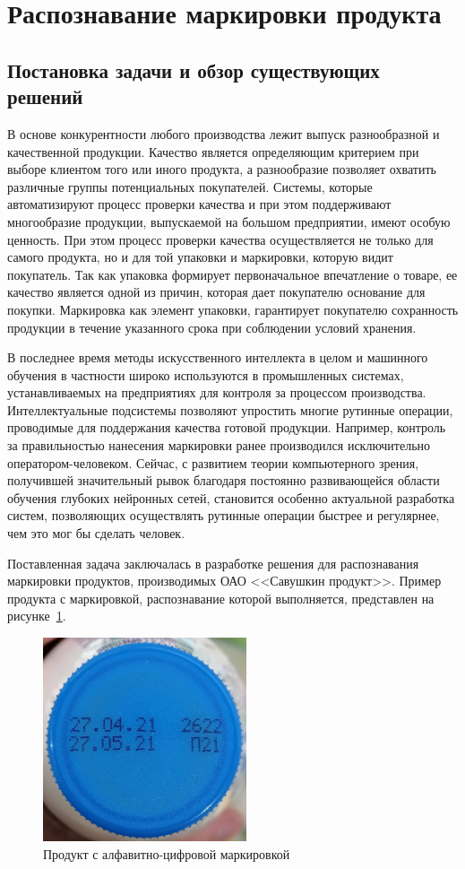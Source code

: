 \section{Распознавание маркировки продукта}

\subsection{Постановка задачи и обзор существующих решений}

В основе конкурентности любого производства лежит выпуск разнообразной и качественной продукции. Качество является определяющим критерием при выборе клиентом того или иного продукта, а разнообразие позволяет охватить различные группы потенциальных покупателей. Системы, которые автоматизируют процесс проверки качества и при этом поддерживают многообразие продукции, выпускаемой на большом предприятии, имеют особую ценность. При этом процесс проверки качества осуществляется не только для самого продукта, но и для той упаковки и маркировки, которую видит покупатель. Так как упаковка формирует первоначальное впечатление о товаре, ее качество является одной из причин, которая дает покупателю основание для покупки. Маркировка как элемент упаковки, гарантирует покупателю сохранность продукции в течение указанного срока при соблюдении условий хранения.

В последнее время методы искусственного интеллекта в целом и машинного обучения в частности широко используются в промышленных системах, устанавливаемых на предприятиях для контроля за процессом производства. Интеллектуальные подсистемы позволяют упростить многие рутинные операции, проводимые для поддержания качества готовой продукции. Например, контроль за правильностью нанесения маркировки ранее производился исключительно оператором-человеком. Сейчас, с развитием теории компьютерного зрения, получившей значительный рывок благодаря постоянно развивающейся области обучения глубоких нейронных сетей, становится особенно актуальной разработка систем, позволяющих осуществлять рутинные операции быстрее и регулярнее, чем это мог бы сделать человек.

Поставленная задача заключалась в разработке решения для распознавания маркировки продуктов, производимых ОАО <<Савушкин продукт>>. Пример продукта с маркировкой, распознавание которой выполняется, представлен на рисунке~\ref{fig:digital_code}.

\begin{figure}[ht]
	\centering
	\includegraphics[width=6cm]{man-source/images/ch4/pic4-1.jpg}
	\caption{Продукт с алфавитно-цифровой маркировкой}
	\label{fig:digital_code}
\end{figure}


